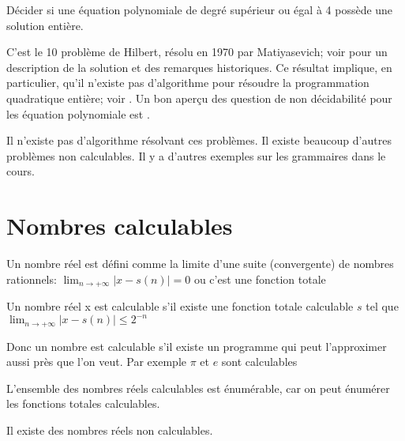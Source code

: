 \begin{mydef}
  Décider si une équation
  polynomiale de degré supérieur ou égal à 4 possède une solution entière.
\end{mydef}
C'est le 10\ieme{} problème de Hilbert, résolu en 1970 par Matiyasevich;
voir \cite{davis1973hilbert} pour un description de la solution et des remarques historiques.
Ce résultat implique, en particulier, qu'il n'existe pas d'algorithme pour résoudre
la programmation quadratique entière; voir \cite{jeroslow1973there}.
Un bon aperçu des question de non décidabilité pour les équation polynomiale est \cite{koenigsmann2014undecidability}.

Il n'existe pas d'algorithme résolvant ces problèmes. Il existe beaucoup
d'autres problèmes non calculables. Il y a d'autres exemples sur les grammaires dans le cours.

\section{Nombres calculables}
\label{sec:nombres_calculables}

\begin{mydef}
	Un nombre réel est défini comme la limite d'une suite (convergente) de
	nombres rationnels: $\lim_{n \rightarrow +\infty} |x-s(n)| = 0 $ ou c’est
	une fonction totale
\end{mydef}

\begin{mydef}
	Un nombre réel x est calculable s’il existe une fonction totale
	calculable $s$ tel que $\lim_{n \rightarrow +\infty} |x-s(n)| \leq 2^{-n}$
\end{mydef}

\begin{myrem}
	Donc un nombre est calculable s'il existe un programme qui peut
	l'approximer aussi près que l'on veut. Par exemple $\pi$ et $e$ sont
	calculables
\end{myrem}

\begin{myprop}
	L'ensemble des nombres réels calculables est énumérable, car on peut énumérer les
	fonctions totales calculables.
\end{myprop}

\begin{myprop}
	Il existe des nombres réels non calculables.
\end{myprop}

